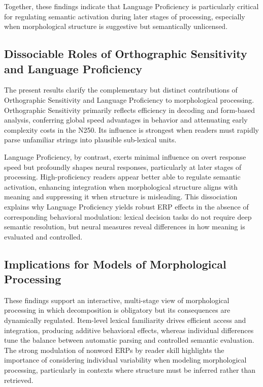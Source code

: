 \documentclass[preprint,12pt, authoryear, review]{elsarticle}
\begin{document}
Together, these findings indicate that Language Proficiency is particularly critical for regulating semantic activation during later stages of processing, especially when morphological structure is suggestive but semantically unlicensed.

\subsection{Dissociable Roles of Orthographic Sensitivity and Language Proficiency}

The present results clarify the complementary but distinct contributions of Orthographic Sensitivity and Language Proficiency to morphological processing. Orthographic Sensitivity primarily reflects efficiency in decoding and form-based analysis, conferring global speed advantages in behavior and attenuating early complexity costs in the N250. Its influence is strongest when readers must rapidly parse unfamiliar strings into plausible sub-lexical units.

Language Proficiency, by contrast, exerts minimal influence on overt response speed but profoundly shapes neural responses, particularly at later stages of processing. High-proficiency readers appear better able to regulate semantic activation, enhancing integration when morphological structure aligns with meaning and suppressing it when structure is misleading. This dissociation explains why Language Proficiency yields robust ERP effects in the absence of corresponding behavioral modulation: lexical decision tasks do not require deep semantic resolution, but neural measures reveal differences in how meaning is evaluated and controlled.

\subsection{Implications for Models of Morphological Processing}

These findings support an interactive, multi-stage view of morphological processing in which decomposition is obligatory but its consequences are dynamically regulated. Item-level lexical familiarity drives efficient access and integration, producing additive behavioral effects, whereas individual differences tune the balance between automatic parsing and controlled semantic evaluation. The strong modulation of nonword ERPs by reader skill highlights the importance of considering individual variability when modeling morphological processing, particularly in contexts where structure must be inferred rather than retrieved.
\end{document}
